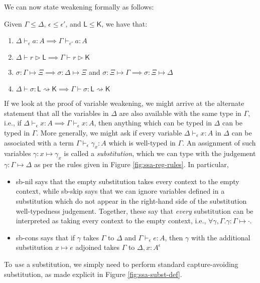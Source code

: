 \documentclass[acmsmall,screen,review]{acmart}
\newcounter{todos}
\newcommand{\todo}[1]{\stepcounter{todos} \textcolor{red}{TODO \arabic{todos}: #1}}
\newcommand{\ms}[1]{\ensuremath{\mathsf{#1}}}
\newcommand{\thyp}[3]{#1 : {#2}^{#3}}
\newcommand{\hasty}[4]{#1 \vdash_{#2} #3: {#4}}
\newcommand{\haslb}[3]{#1 \vdash #2 \rhd #3}
\newcommand{\issubst}[3]{#1: #2 \mapsto #3}
\newcommand{\lbsubst}[4]{#1 \vdash #2: #3 \rightsquigarrow #4}
\newcommand{\brle}[1]{{\scriptsize\textsf{#1}}}
\begin{document}
We can now state weakening formally as follows:
\begin{lemma}[Weakening]
  Given $\Gamma \leq \Delta$, $\epsilon \leq \epsilon'$, and $\ms{L} \leq \ms{K}$, we have that:
  \begin{enumerate}[label=(\alph*)]
    \item $\hasty{\Delta}{\epsilon}{a}{A} \implies \hasty{\Gamma}{\epsilon'}{a}{A}$
    \item $\haslb{\Delta}{r}{\ms{L}} \implies \haslb{\Gamma}{r}{\ms{K}}$
    \item $\issubst{\sigma}{\Gamma}{\Xi} \implies \issubst{\sigma}{\Delta}{\Xi}$ and 
          $\issubst{\sigma}{\Xi}{\Gamma} \implies \issubst{\sigma}{\Xi}{\Delta}$
    \item $\lbsubst{\Delta}{\sigma}{\ms{L}}{\ms{K}} \implies \lbsubst{\Gamma}{\sigma}{\ms{L}}{\ms{K}}$
  \end{enumerate}
\end{lemma}

If we look at the proof of variable weakening, we might arrive at the alternate
statement that all the variables in $\Delta$ are also available with the same
type in $\Gamma$, i.e., if $\hasty{\Delta}{\epsilon}{x}{A} \implies
\hasty{\Gamma}{\epsilon}{x}{A}$, then anything which can be typed in $\Delta$
can be typed in $\Gamma$. More generally, we might ask if every variable
$\hasty{\Delta}{\epsilon}{x}{A}$ in $\Delta$ can be associated with a term
$\hasty{\Gamma}{\epsilon}{\gamma_x}{A}$ which is well-typed in $\Gamma$. An
assignment of such variables $\gamma : x \mapsto \gamma_x$ is called a
\emph{substitution}, which we can type with the judgement
$\issubst{\gamma}{\Gamma}{\Delta}$ as per the rules given in Figure
\ref{fig:ssa-reg-rules}. In particular,
\begin{itemize}
  \item \brle{sb-nil} says that the empty substitution takes every context to
  the empty context, while \brle{sb-skip} says that we can ignore variables
  defined in a substitution which do not appear in the right-hand side of the
  substitution well-typedness judgement. Together, these say that \emph{every}
  substitution can be interpreted as taking every context to the empty context,
  i.e., $\forall \gamma, \Gamma. \issubst{\gamma}{\Gamma}{\cdot}$.
  \item \brle{sb-cons} says that if $\gamma$ takes $\Gamma$ to $\Delta$ and
  $\hasty{\Gamma}{\epsilon}{e}{A}$, then $\gamma$ with the additional
  substitution $x \mapsto e$ adjoined takes $\Gamma$ to $\Delta,
  \thyp{x}{A}{\epsilon}$
\end{itemize}
To \emph{use} a substitution, we simply need to perform standard
capture-avoiding substitution, as made explicit in Figure
\ref{fig:ssa-subst-def}.
\end{document}
